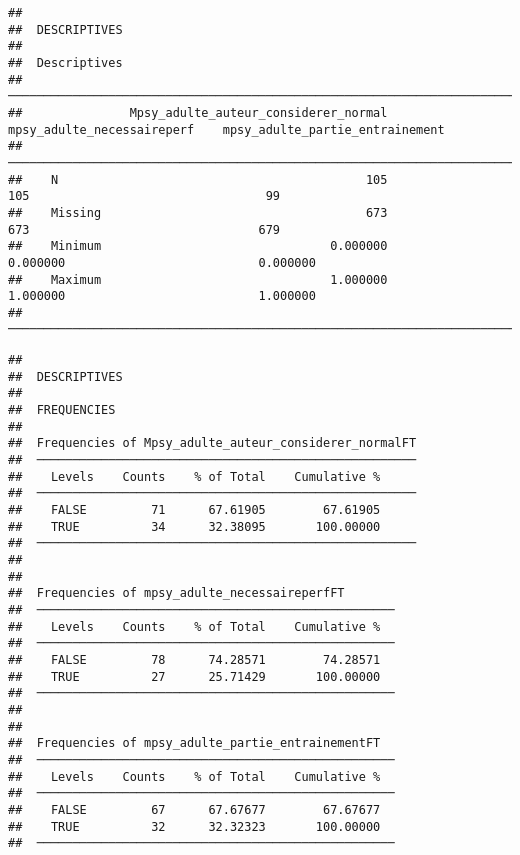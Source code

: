 \documentclass[
]{article}
\begin{document}
\begin{verbatim}
## 
##  DESCRIPTIVES
## 
##  Descriptives                                                                                                         
##  ──────────────────────────────────────────────────────────────────────────────────────────────────────────────────── 
##               Mpsy_adulte_auteur_considerer_normal    mpsy_adulte_necessaireperf    mpsy_adulte_partie_entrainement   
##  ──────────────────────────────────────────────────────────────────────────────────────────────────────────────────── 
##    N                                           105                           105                                 99   
##    Missing                                     673                           673                                679   
##    Minimum                                0.000000                      0.000000                           0.000000   
##    Maximum                                1.000000                      1.000000                           1.000000   
##  ────────────────────────────────────────────────────────────────────────────────────────────────────────────────────
\end{verbatim}

\begin{verbatim}
## 
##  DESCRIPTIVES
## 
##  FREQUENCIES
## 
##  Frequencies of Mpsy_adulte_auteur_considerer_normalFT 
##  ───────────────────────────────────────────────────── 
##    Levels    Counts    % of Total    Cumulative %   
##  ───────────────────────────────────────────────────── 
##    FALSE         71      67.61905        67.61905   
##    TRUE          34      32.38095       100.00000   
##  ───────────────────────────────────────────────────── 
## 
## 
##  Frequencies of mpsy_adulte_necessaireperfFT        
##  ────────────────────────────────────────────────── 
##    Levels    Counts    % of Total    Cumulative %   
##  ────────────────────────────────────────────────── 
##    FALSE         78      74.28571        74.28571   
##    TRUE          27      25.71429       100.00000   
##  ────────────────────────────────────────────────── 
## 
## 
##  Frequencies of mpsy_adulte_partie_entrainementFT   
##  ────────────────────────────────────────────────── 
##    Levels    Counts    % of Total    Cumulative %   
##  ────────────────────────────────────────────────── 
##    FALSE         67      67.67677        67.67677   
##    TRUE          32      32.32323       100.00000   
##  ──────────────────────────────────────────────────
\end{verbatim}
\end{document}
